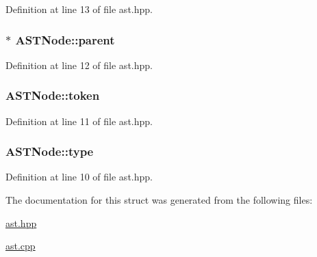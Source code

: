 Definition at line 13 of file ast.\+hpp.

\hypertarget{struct_a_s_t_node_aaa1e479bfeb485d93a4866f9c2daf171}{}
\subsubsection[{parent}]{$\ast$ A\+S\+T\+Node\+::parent}\label{struct_a_s_t_node_aaa1e479bfeb485d93a4866f9c2daf171}


Definition at line 12 of file ast.\+hpp.

\hypertarget{struct_a_s_t_node_a99c0fc8e2fe4c99fbe85d0d195cfab57}{}
\subsubsection[{token}]{ A\+S\+T\+Node\+::token}\label{struct_a_s_t_node_a99c0fc8e2fe4c99fbe85d0d195cfab57}


Definition at line 11 of file ast.\+hpp.

\hypertarget{struct_a_s_t_node_a34086f3bc5af008f08f255c8ec57ba21}{}
\subsubsection[{type}]{ A\+S\+T\+Node\+::type}\label{struct_a_s_t_node_a34086f3bc5af008f08f255c8ec57ba21}


Definition at line 10 of file ast.\+hpp.



The documentation for this struct was generated from the following files\+:\begin{DoxyCompactItemize}
\item 
\hyperlink{ast_8hpp}{ast.\+hpp}\item 
\hyperlink{ast_8cpp}{ast.\+cpp}\end{DoxyCompactItemize}
